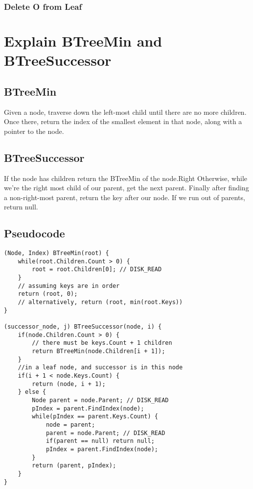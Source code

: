 \documentclass{article}
\begin{document}
\subsubsection*{Delete O from Leaf}

\section{Explain BTreeMin and BTreeSuccessor}
\subsection*{BTreeMin}
Given a node, traverse down the left-most child until there are no more children.
Once there, return the index of the smallest element in that node, along with a pointer to the node.
\subsection*{BTreeSuccessor}
If the node has children return the BTreeMin of the node.Right
Otherwise, while we're the right most child of our parent, get the next parent.
Finally after finding a non-right-most parent, return the key after our node.
If we run out of parents, return null.

\subsection*{Pseudocode}
\begin{lstlisting}
(Node, Index) BTreeMin(root) {
    while(root.Children.Count > 0) {
        root = root.Children[0]; // DISK_READ
    }
    // assuming keys are in order
    return (root, 0);
    // alternatively, return (root, min(root.Keys))
}

(successor_node, j) BTreeSuccessor(node, i) {
    if(node.Children.Count > 0) {
        // there must be keys.Count + 1 children
        return BTreeMin(node.Children[i + 1]);
    }
    //in a leaf node, and successor is in this node
    if(i + 1 < node.Keys.Count) {
        return (node, i + 1);
    } else {
        Node parent = node.Parent; // DISK_READ
        pIndex = parent.FindIndex(node);
        while(pIndex == parent.Keys.Count) {
            node = parent;
            parent = node.Parent; // DISK_READ
            if(parent == null) return null;
            pIndex = parent.FindIndex(node);
        }
        return (parent, pIndex);
    }
}
\end{lstlisting}
\end{document}
